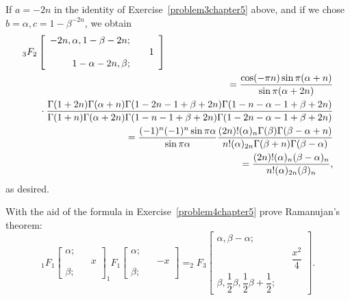\begin{solution}
If $a=-2n$ in the identity of Exercise~\ref{problem3chapter5} above, and if we chose $b = \alpha, c=1-\beta^{-2n}$, we obtain
\begin{eqnarray*}
\lefteqn{{}_3F_2 \left[ \begin{array}{rlr}
-2n, \alpha, 1-\beta-2n; & & \\
& & 1 \\
1- \alpha - 2n, \beta; & &
\end{array} \right]} \\
& &= \dfrac{\cos(- \pi n) \sin \pi(\alpha+n)}{\sin \pi(\alpha+2n)} \\
& & \phantom{=}\cdot\dfrac{\Gamma(1+2n)\Gamma(\alpha+n) \Gamma(1-2n-1+\beta+2n)\Gamma(1-n-\alpha-1+\beta+2n)}{\Gamma(1+n) \Gamma(\alpha + 2n)\Gamma(1-n-1+\beta+2n) \Gamma(1-2n-\alpha-1+\beta+2n)} \\
& &= \dfrac{(-1)^n (-1)^n \sin \pi \alpha}{\sin \pi \alpha} \dfrac{(2n)! (\alpha)_n \Gamma(\beta) \Gamma(\beta - \alpha + n)}{n! (\alpha)_{2n} \Gamma(\beta + n) \Gamma(\beta - \alpha)} \\
& &= \dfrac{(2n)! (\alpha)_n (\beta - \alpha)_n}{n! (\alpha)_{2n} (\beta)_n},
\end{eqnarray*}
as desired.
\end{solution}
\begin{problem}\label{problem5chapter5}
With the aid of the formula in Exercise~\ref{problem4chapter5} prove Ramanujan's theorem:
$$_1F_1\left[ \begin{array}{rlr}
\alpha; & & \\
& & x \\
\beta; & & 
\end{array} \right] _1F_1 \left[ \begin{array}{rlr}
\alpha; & & \\
& & -x \\
\beta; & &
\end{array} \right] = _2F_3 \left[ \begin{array}{rlr}
\alpha, \beta - \alpha; & & \\
& & \dfrac{x^2}{4} \\
\beta, \dfrac{1}{2}\beta, \dfrac{1}{2}\beta + \dfrac{1}{2};
\end{array} \right].$$
\end{problem}
